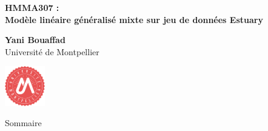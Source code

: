 \documentclass[unknownkeysallowed]{beamer}
\begin{document}



\begin{frame}
\bigskip
\bigskip
\begin{center}{
\LARGE\color{marron}
\textbf{HMMA307 : \\ Modèle linéaire généralisé mixte sur jeu de données Estuary}
\textbf{ }\\
\vspace{0.5cm}
}

\color{marron}
\textbf{}
\end{center}

\vspace{0.5cm}

\begin{center}
\textbf{Yani Bouaffad} \\
\vspace{0.1cm}
Université de Montpellier \\
\end{center}
\centering
\includegraphics[width=0.13\textwidth]{Logo}

\end{frame}






\begin{frame}{Sommaire}
\tableofcontents[hideallsubsections]
\end{frame}


\end{document}
